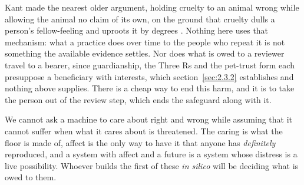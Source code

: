 Kant made the nearest older argument, holding cruelty to an animal wrong while allowing the animal no claim of its own, on the ground that cruelty dulls a person's fellow-feeling and uproots it by degrees \autocite[6:442–43]{kant1996metaphysics}. Nothing here uses that mechanism: what a practice does over time to the people who repeat it is not something the available evidence settles. Nor does what is owed to a reviewer travel to a bearer, since guardianship, the Three Rs and the pet-trust form each presuppose a beneficiary with interests, which section~\ref{sec:2.3.2} establishes and nothing above supplies. There is a cheap way to end this harm, and it is to take the person out of the review step, which ends the safeguard along with it.

We cannot ask a machine to care about right and wrong while assuming that it cannot suffer when what it cares about is threatened. The caring is what the floor is made of, affect is the only way to have it that anyone has \emph{definitely} reproduced, and a system with affect and a future is a system whose distress is a live possibility. Whoever builds the first of these \emph{in silico} will be deciding what is owed to them.
